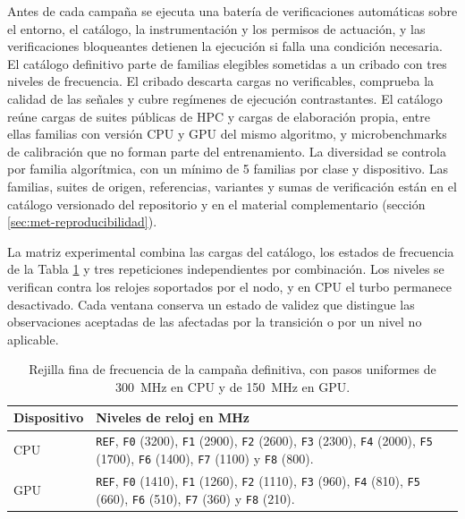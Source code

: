 Antes de cada campaña se ejecuta una batería de verificaciones automáticas sobre el entorno, el catálogo, la instrumentación y los permisos de actuación, y las verificaciones bloqueantes detienen la ejecución si falla una condición necesaria. El catálogo definitivo parte de familias elegibles sometidas a un cribado con tres niveles de frecuencia. El cribado descarta cargas no verificables, comprueba la calidad de las señales y cubre regímenes de ejecución contrastantes. El catálogo reúne cargas de suites públicas de HPC y cargas de elaboración propia, entre ellas familias con versión CPU y GPU del mismo algoritmo, y microbenchmarks de calibración que no forman parte del entrenamiento. La diversidad se controla por familia algorítmica, con un mínimo de 5 familias por clase y dispositivo. Las familias, suites de origen, referencias, variantes y sumas de verificación están en el catálogo versionado del repositorio y en el material complementario (sección \ref{sec:met-reproducibilidad}).

La matriz experimental combina las cargas del catálogo, los estados de frecuencia de la Tabla \ref{tab:frecuencias} y tres repeticiones independientes por combinación. Los niveles se verifican contra los relojes soportados por el nodo, y en CPU el turbo permanece desactivado. Cada ventana conserva un estado de validez que distingue las observaciones aceptadas de las afectadas por la transición o por un nivel no aplicable.

\begin{table}[H]
\centering
\caption[Rejilla fina de frecuencia de la campaña definitiva]{Rejilla fina de frecuencia de la campaña definitiva, con pasos uniformes de 300~MHz en CPU y de 150~MHz en GPU.}
\label{tab:frecuencias}
\small
\begin{tabular}{@{}lp{10.4cm}@{}}
\toprule
\textbf{Dispositivo} & \textbf{Niveles de reloj en MHz} \\
\midrule
CPU & \texttt{REF}, \texttt{F0} (3200), \texttt{F1} (2900), \texttt{F2} (2600), \texttt{F3} (2300), \texttt{F4} (2000), \texttt{F5} (1700), \texttt{F6} (1400), \texttt{F7} (1100) y \texttt{F8} (800). \\
GPU & \texttt{REF}, \texttt{F0} (1410), \texttt{F1} (1260), \texttt{F2} (1110), \texttt{F3} (960), \texttt{F4} (810), \texttt{F5} (660), \texttt{F6} (510), \texttt{F7} (360) y \texttt{F8} (210). \\
\bottomrule
\end{tabular}
\end{table}

